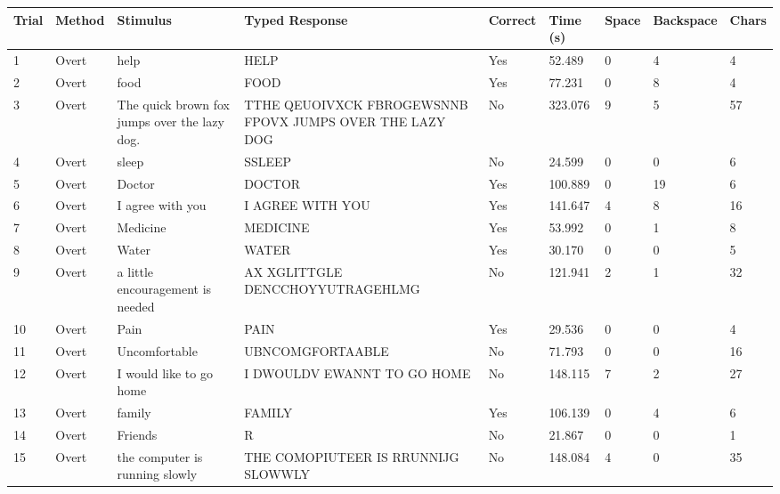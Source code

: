 \documentclass[10pt,a4paper]{article}
\begin{document}
\begin{center}
\begin{tabularx}{\textwidth}{
    C{0.45in}
    C{0.65in}
    L{2.35in}
    L{2.55in}
    C{0.65in}
    C{0.65in}
    C{0.55in}
    C{0.75in}
    C{0.55in}
}
\toprule

\textbf{Trial} &
\textbf{Method} &
\textbf{Stimulus} &
\textbf{Typed Response} &
\textbf{Correct} &
\textbf{Time (s)} &
\textbf{Space} &
\textbf{Backspace} &
\textbf{Chars}
\\

\midrule

1 &
Overt &
help &
HELP &
Yes &
52.489 &
0 &
4 &
4
\\

2 &
Overt &
food &
FOOD &
Yes &
77.231 &
0 &
8 &
4
\\

3 &
Overt &
The quick brown fox jumps over the lazy dog. &
TTHE  QEUOIVXCK FBROGEWSNNB FPOVX JUMPS OVER THE LAZY DOG &
No &
323.076 &
9 &
5 &
57
\\

4 &
Overt &
sleep &
SSLEEP &
No &
24.599 &
0 &
0 &
6
\\

5 &
Overt &
Doctor &
DOCTOR &
Yes &
100.889 &
0 &
19 &
6
\\

6 &
Overt &
I agree with you &
I AGREE WITH YOU &
Yes &
141.647 &
4 &
8 &
16
\\

7 &
Overt &
Medicine &
MEDICINE &
Yes &
53.992 &
0 &
1 &
8
\\

8 &
Overt &
Water &
WATER &
Yes &
30.170 &
0 &
0 &
5
\\

9 &
Overt &
a little encouragement is needed &
AX XGLITTGLE DENCCHOYYUTRAGEHLMG &
No &
121.941 &
2 &
1 &
32
\\

10 &
Overt &
Pain &
PAIN &
Yes &
29.536 &
0 &
0 &
4
\\

11 &
Overt &
Uncomfortable &
UBNCOMGFORTAABLE &
No &
71.793 &
0 &
0 &
16
\\

12 &
Overt &
I would like to go home &
I DWOULDV EWANNT TO GO HOME &
No &
148.115 &
7 &
2 &
27
\\

13 &
Overt &
family &
FAMILY &
Yes &
106.139 &
0 &
4 &
6
\\

14 &
Overt &
Friends &
R &
No &
21.867 &
0 &
0 &
1
\\

15 &
Overt &
the computer is running slowly &
THE COMOPIUTEER IS RRUNNIJG SLOWWLY &
No &
148.084 &
4 &
0 &
35
\\

\bottomrule
\end{tabularx}
\end{center}
\end{document}
